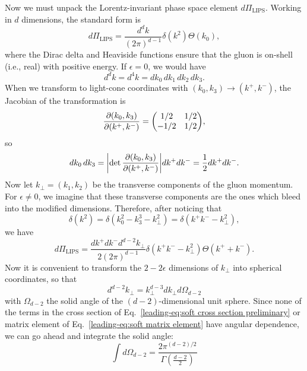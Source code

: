 \documentclass[../thesis.tex]{subfiles}
\providecommand{\LIPS}{\mathrm{LIPS}}
\begin{document}
	Now we must unpack the Lorentz-invariant phase space element $d\Pi_\LIPS$. Working in $d$ dimensions, the standard form is
	\begin{equation}
		d\Pi_\LIPS = \frac{d^d k}{(2\pi)^{d-1}}\delta(k^2)\Theta(k_0),
	\end{equation}
	where the Dirac delta and Heaviside functions ensure that the gluon is on-shell (i.e., real) with positive energy. If $\epsilon = 0$, we would have
	\begin{equation}
		d^d k = d^4 k = dk_0 \,dk_1 \,dk_2 \,dk_3.
	\end{equation}
	When we transform to light-cone coordinates with $(k_0, k_3) \to (k^+, k^-)$, the Jacobian of the transformation is
	\begin{equation}
		\frac{\partial(k_0, k_3)}{\partial(k^+, k^-)} = \mqty(1/2 & 1/2 \\ -1/2 & 1/2),
	\end{equation}
	so
	\begin{equation}
		dk_0 \, dk_3 = \abs{\det \frac{\partial(k_0, k_3)}{\partial(k^+, k^-)}} dk^+ dk^- = \frac{1}{2} dk^+ dk^-.
	\end{equation}
	Now let $k_\perp = (k_1, k_2)$ be the transverse components of the gluon momentum. For $\epsilon \neq 0$, we imagine that these transverse components are the ones which bleed into the modified dimensions. Therefore, after noticing that
	\begin{equation}
		\delta(k^2) = \delta(k_0^2 - k_3^3 - k_\perp^2) = \delta(k^+ k^- - k_\perp^2),
	\end{equation}
	we have
	\begin{equation}
		d\Pi_\LIPS = \frac{dk^+ dk^- d^{d-2}k_\perp}{2(2\pi)^{d-1}} \delta(k^+ k^- - k_\perp^2)\Theta(k^+ + k^-).
	\end{equation}
	Now it is convenient to transform the $2 - 2\epsilon$ dimensions of $k_\perp$ into spherical coordinates, so that
	\begin{equation}
		d^{d - 2}k_\perp = k_\perp^{d-3} dk_\perp d\Omega_{d-2}
	\end{equation}
	with $\Omega_{d-2}$ the solid angle of the $(d-2)$-dimensional unit sphere. Since none of the terms in the cross section of Eq.~\ref{leading-eq:soft cross section preliminary} or matrix element of Eq.~\ref{leading-eq:soft matrix element} have angular dependence, we can go ahead and integrate the solid angle:
	\begin{equation}
		\int d\Omega_{d-2} = \frac{2\pi^{(d-2)/2}}{\Gamma(\frac{d-2}{2})}
	\end{equation}
\end{document}
